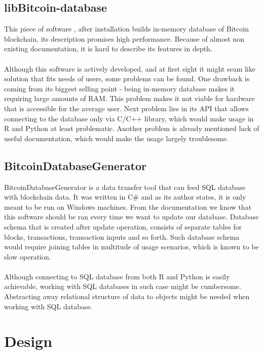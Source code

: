 \documentclass[12pt, en, eng, oneside, final]{mgr}
\begin{document}
\section{libBitcoin-database}

This piece of software \cite{libbitcoin-database}, after installation builds in-memory database of Bitcoin blockchain, its description promises high performance. Because of almost non existing documentation, it is hard to describe its features in depth.
\\
\\
Although this software is actively developed, and at first sight it might seam like solution that fits needs of users, some problems can be found. One drawback is coming from its biggest selling point - being in-memory database makes it requiring large amounts of RAM. This problem makes it not viable for hardware that is accessible for the average user. Next problem lies in its API that allows connecting to the database only via C/C++ library, which would make usage in R and Python at least problematic. Another problem is already mentioned lack of useful documentation, which would make the usage largely troublesome.

\section{BitcoinDatabaseGenerator}

BitcoinDatabaseGenerator \cite{BitcoinDatabaseGenerator} is a data transfer tool that can feed SQL database with blockchain data. It was written in C\# and as its author states, it is only meant to be run on Windows machines. From the documentation we know that this software should be ran every time we want to update our database. Database schema that is created after update operation, consists of separate tables for blocks, transactions, transaction inputs and so forth. Such database schema would require joining tables in multitude of usage scenarios, which is known to be slow operation.
\\
\\
Although connecting to SQL database from both R and Python is easily achievable, working with SQL databases in such case might be cumbersome. Abstracting away relational structure of data to objects might be needed when working with SQL database. 


\chapter{Design}
\end{document}
